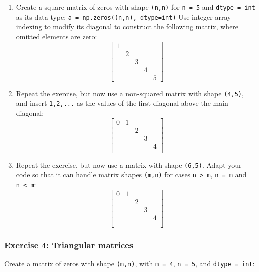 \documentclass[10pt]{scrartcl}
\begin{document}
\begin{enumerate}
\def\labelenumi{\arabic{enumi}.}
\item
  Create a square matrix of zeros with shape \texttt{(n,n)} for
  \texttt{n\ =\ 5} and \texttt{dtype\ =\ int} as its data type:
  \texttt{a\ =\ np.zeros((n,n),\ dtype=int)} Use integer array indexing
  to modify its diagonal to construct the following matrix, where
  omitted elements are zero: \[
  \begin{bmatrix}
  1 &   &   &   & \\
    & 2 &   &   & \\
    &   & 3 &   & \\
    &   &   & 4 & \\
    &   &   &   & 5     
  \end{bmatrix}
  \]
\item
  Repeat the exercise, but now use a non-squared matrix with shape
  \texttt{(4,5)}, and insert \texttt{1,2,...} as the values of the first
  diagonal above the main diagonal: \[
  \begin{bmatrix}
   0 & 1 &   &   &   \\
   &   & 2 &   &   \\
   &   &   & 3 &   \\
   &   &   &   & 4 \\
  \end{bmatrix}
  \]
\item
  Repeat the exercise, but now use a matrix with shape \texttt{(6,5)}.
  Adapt your code so that it can handle matrix shapes \texttt{(m,n)} for
  cases \texttt{n\ \textgreater{}\ m}, \texttt{n\ =\ m} and
  \texttt{n\ \textless{}\ m}: \[
  \begin{bmatrix}
   0 & 1 &   &   &   \\
   &   & 2 &   &   \\
   &   &   & 3 &   \\
   &   &   &   & 4 \\
   &&&& \\
   &&&&
  \end{bmatrix}
  \]
\end{enumerate}

    \hypertarget{exercise-4-triangular-matrices}{%
\subsubsection{Exercise 4: Triangular
matrices}\label{exercise-4-triangular-matrices}}

Create a matrix of zeros with shape \texttt{(m,n)}, with
\texttt{m\ =\ 4}, \texttt{n\ =\ 5}, and \texttt{dtype\ =\ int}:
\end{document}
